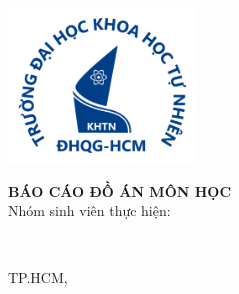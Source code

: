 \begin{center}
\begin{spacing}{1.3}
    \textbf{\large {\UNIVERSITY}}\\
    \textbf{\large {\UPMCentre}}\\
    \vspace{5mm}
\end{spacing}
    \includegraphics[width=5cm]{figures/Logo_HCMUS.png}

\begin{spacing}{2.0}
\textbf{\LARGE {\thesisTitle}}
\end{spacing}

\vspace{15 mm}

\begin{spacing}{1.3}
\textbf{\LARGE {BÁO CÁO ĐỒ ÁN MÔN HỌC}}\\
\medskip
{\large {Nhóm sinh viên thực hiện:}}
\end{spacing}
\end{center}


\begin{center}
\begin{spacing}{1.3}
\textbf{\large {\thesisAuthor}}\\
\end{spacing}
\end{center}

\vspace{\fill}

\begin{center}
   \large {TP.HCM, \thesisDate}
\end{center}